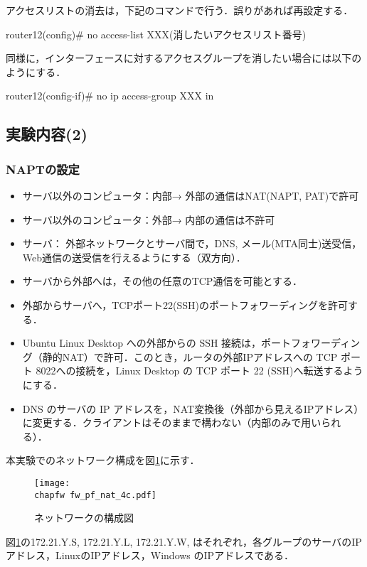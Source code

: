 アクセスリストの消去は，下記のコマンドで行う．誤りがあれば再設定する．
\begin{cli}
router12(config)# no access-list XXX(消したいアクセスリスト番号)
\end{cli}

同様に，インターフェースに対するアクセスグループを消したい場合には以下のようにする．
\begin{cli}
router12(config-if)# no ip access-group XXX in
\end{cli}

\clearpage

\subsection{実験内容(2)}

\subsubsection{NAPTの設定}

\begin{itemize}
 \item サーバ以外のコンピュータ：内部→ 外部の通信はNAT(NAPT, PAT)で許可
 \item サーバ以外のコンピュータ：外部→ 内部の通信は不許可
 \item サーバ： 外部ネットワークとサーバ間で，DNS, メール(MTA同士)送受信，Web通信の送受信を行えるようにする（双方向）．
 \item サーバから外部へは，その他の任意のTCP通信を可能とする．
 \item 外部からサーバへ，TCPポート22(SSH)のポートフォワーディングを許可する．
 \item Ubuntu Linux Desktop への外部からの SSH 接続は，ポートフォワーディング（静的NAT）で許可．このとき，ルータの外部IPアドレスへの TCP ポート 8022への接続を，Linux Desktop の TCP ポート 22 (SSH)へ転送するようにする． 
 \item DNS のサーバの IP アドレスを，NAT変換後（外部から見えるIPアドレス）に変更する．クライアントはそのままで構わない（内部のみで用いられる）．
\end{itemize}
本実験でのネットワーク構成を図\ref{fig:06:packet-filter}に示す．
\begin{figure}
  \centering
  \texttt{[image: \\chapfw fw\_pf\_nat\_4c.pdf]}
  \caption{ネットワークの構成図}
  \label{fig:06:packet-filter}
\end{figure}
図\ref{fig:06:packet-filter}の172.21.Y.S, 172.21.Y.L, 172.21.Y.W, はそれぞれ，各グループのサーバのIPアドレス，LinuxのIPアドレス，Windows のIPアドレスである．

